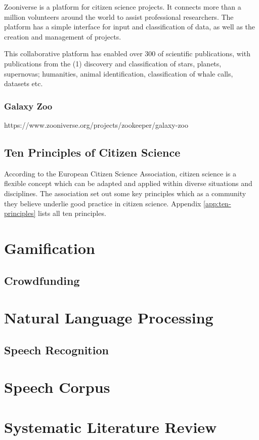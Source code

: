 Zooniverse is a platform for citizen science projects. It connects more than a million volunteers around the world to assist professional researchers. The platform has a simple interface for input and classification of data, as well as the creation and management of projects.

This collaborative platform has enabled over 300 of scientific publications, with publications from the (1) discovery and classification of stars, planets, supernovas; humanities, animal identification, classification of whale calls, datasets etc.

\subsubsection{Galaxy Zoo}

https://www.zooniverse.org/projects/zookeeper/galaxy-zoo

\subsection{Ten Principles of Citizen Science}

According to the European Citizen Science Association, citizen science is a flexible concept which can be adapted and applied within diverse situations and disciplines. The association set out some key principles which as a community they believe underlie good practice in citizen science. Appendix \ref{app:ten-principles} lists all ten principles.

\section{Gamification}

\subsection{Crowdfunding}

\section{Natural Language Processing}

\subsection{Speech Recognition}

\section{Speech Corpus}

\section{Systematic Literature Review}

